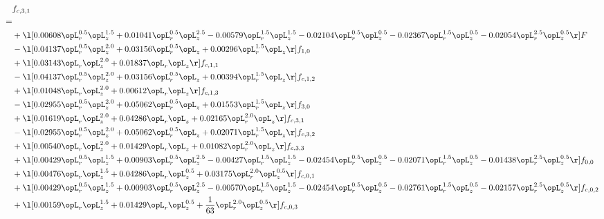 \begin{alignat}{2} 
\label{eq:f_31_1} 
& f_{c,3,1} \nonumber \\ 
 = \\ 
& + \l[  0.00608 \opL_r^{0.5} \opL_z^{1.5} +  0.01041 \opL_r^{0.5} \opL_z^{2.5}   -0.00579 \opL_r^{1.5} \opL_z^{1.5}   -0.02104 \opL_r^{0.5} \opL_z^{0.5}   -0.02367 \opL_r^{1.5} \opL_z^{0.5}   -0.02054 \opL_r^{2.5} \opL_z^{0.5}  \r] F \nonumber \\ 
& - \l[  0.04137 \opL_r^{0.5} \opL_z^{2.0} +  0.03156 \opL_r^{0.5} \opL_z +  0.00296 \opL_r^{1.5} \opL_z  \r] f_{1,0} \nonumber \\ 
& + \l[  0.03143 \opL_r \opL_z^{2.0} +  0.01837 \opL_r \opL_z  \r] f_{c,1,1} \nonumber \\ 
& - \l[  0.04137 \opL_r^{0.5} \opL_z^{2.0} +  0.03156 \opL_r^{0.5} \opL_z +  0.00394 \opL_r^{1.5} \opL_z  \r] f_{c,1,2} \nonumber \\ 
& + \l[  0.01048 \opL_r \opL_z^{2.0} +  0.00612 \opL_r \opL_z  \r] f_{c,1,3} \nonumber \\ 
& - \l[  0.02955 \opL_r^{0.5} \opL_z^{2.0} +  0.05062 \opL_r^{0.5} \opL_z +  0.01553 \opL_r^{1.5} \opL_z  \r] f_{3,0} \nonumber \\ 
& + \l[  0.01619 \opL_r \opL_z^{2.0} +  0.04286 \opL_r \opL_z +  0.02165 \opL_r^{2.0} \opL_z  \r] f_{c,3,1} \nonumber \\ 
& - \l[  0.02955 \opL_r^{0.5} \opL_z^{2.0} +  0.05062 \opL_r^{0.5} \opL_z +  0.02071 \opL_r^{1.5} \opL_z  \r] f_{c,3,2} \nonumber \\ 
& + \l[  0.00540 \opL_r \opL_z^{2.0} +  0.01429 \opL_r \opL_z +  0.01082 \opL_r^{2.0} \opL_z  \r] f_{c,3,3} \nonumber \\ 
& + \l[  0.00429 \opL_r^{0.5} \opL_z^{1.5} +  0.00903 \opL_r^{0.5} \opL_z^{2.5}   -0.00427 \opL_r^{1.5} \opL_z^{1.5}   -0.02454 \opL_r^{0.5} \opL_z^{0.5}   -0.02071 \opL_r^{1.5} \opL_z^{0.5}   -0.01438 \opL_r^{2.5} \opL_z^{0.5}  \r] f_{0,0} \nonumber \\ 
& + \l[  0.00476 \opL_r \opL_z^{1.5} +  0.04286 \opL_r \opL_z^{0.5} +  0.03175 \opL_r^{2.0} \opL_z^{0.5}  \r] f_{c,0,1} \nonumber \\ 
& + \l[  0.00429 \opL_r^{0.5} \opL_z^{1.5} +  0.00903 \opL_r^{0.5} \opL_z^{2.5}   -0.00570 \opL_r^{1.5} \opL_z^{1.5}   -0.02454 \opL_r^{0.5} \opL_z^{0.5}   -0.02761 \opL_r^{1.5} \opL_z^{0.5}   -0.02157 \opL_r^{2.5} \opL_z^{0.5}  \r] f_{c,0,2} \nonumber \\ 
& + \l[  0.00159 \opL_r \opL_z^{1.5} +  0.01429 \opL_r \opL_z^{0.5} + \frac{1}{63} \opL_r^{2.0} \opL_z^{0.5}  \r] f_{c,0,3} \nonumber \\ 

\end{alignat}
